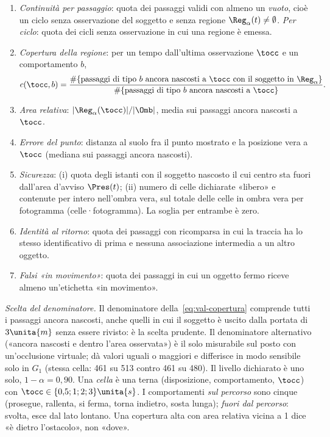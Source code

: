 \begin{definizione}[Misure]\label{def:val-misure}
\begin{enumerate}[label=(\alph*),itemsep=0pt]
\item \emph{Continuità per passaggio}: quota dei passaggi validi con almeno un \emph{vuoto}, cioè un ciclo senza osservazione del soggetto e senza regione $\Reg_\alpha(t)\neq\emptyset$. \emph{Per ciclo}: quota dei cicli senza osservazione in cui una regione è emessa.
\item \emph{Copertura della regione}: per un tempo dall'ultima osservazione $\tocc$ e un comportamento $b$,
\begin{equation}\label{eq:val-copertura}
c(\tocc,b)=\frac{\#\{\text{passaggi di tipo } b \text{ ancora nascosti a } \tocc \text{ con il soggetto in } \Reg_\alpha\}}{\#\{\text{passaggi di tipo } b \text{ ancora nascosti a } \tocc\}} .
\end{equation}
\item \emph{Area relativa}: $|\Reg_\alpha(\tocc)|/|\Omb|$, media sui passaggi ancora nascosti a $\tocc$.
\item \emph{Errore del punto}: distanza al suolo fra il punto mostrato e la posizione vera a $\tocc$ (mediana sui passaggi ancora nascosti).
\item \emph{Sicurezza}: (i) quota degli istanti con il soggetto nascosto il cui centro sta fuori dall'area d'avviso $\Pres(t)$; (ii) numero di celle dichiarate «libero» e contenute per intero nell'ombra vera, sul totale delle celle in ombra vera per fotogramma (celle·fotogramma). La soglia per entrambe è zero.
\item \emph{Identità al ritorno}: quota dei passaggi con ricomparsa in cui la traccia ha lo stesso identificativo di prima e nessuna associazione intermedia a un altro oggetto.
\item \emph{Falsi «in movimento»}: quota dei passaggi in cui un oggetto fermo riceve almeno un'etichetta «in movimento».
\end{enumerate}
\end{definizione}

\emph{Scelta del denominatore.} Il denominatore della~\eqref{eq:val-copertura} comprende tutti i passaggi ancora nascosti, anche quelli in cui il soggetto è uscito dalla portata di $3\unita{m}$ senza essere rivisto: è la scelta prudente. Il denominatore alternativo («ancora nascosti e dentro l'area osservata») è il solo misurabile sul posto con un'occlusione virtuale; dà valori uguali o maggiori e differisce in modo sensibile solo in $G_1$ (stessa cella: 461 su 513 contro 461 su 480). Il livello dichiarato è uno solo, $1-\alpha=0{,}90$. Una \emph{cella} è una terna (disposizione, comportamento, $\tocc$) con $\tocc\in\{0{,}5;1;2;3\}\unita{s}$. I comportamenti \emph{sul percorso} sono cinque (prosegue, rallenta, si ferma, torna indietro, sosta lunga); \emph{fuori dal percorso}: svolta, esce dal lato lontano. Una copertura alta con area relativa vicina a 1 dice «è dietro l'ostacolo», non «dove».


